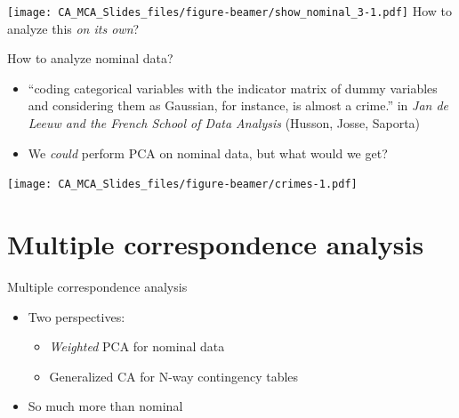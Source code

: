 \documentclass[
  ignorenonframetext,
]{beamer}
\providecommand{\tightlist}{%
  \setlength{\itemsep}{0pt}\setlength{\parskip}{0pt}}
\begin{document}
\begin{frame}

\texttt{[image: CA\_MCA\_Slides\_files/figure-beamer/show\_nominal\_3-1.pdf]}
How to analyze this \emph{on its own}?

\end{frame}

\begin{frame}{How to analyze nominal data?}
\protect\hypertarget{how-to-analyze-nominal-data}{}

\begin{itemize}[<+->]
\tightlist
\item
  ``coding categorical variables with the indicator matrix of dummy
  variables and considering them as Gaussian, for instance, is almost a
  crime.'' in \emph{Jan de Leeuw and the French School of Data Analysis}
  (Husson, Josse, Saporta)
\item
  We \emph{could} perform PCA on nominal data, but what would we get?
\end{itemize}

\end{frame}

\begin{frame}

\texttt{[image: CA\_MCA\_Slides\_files/figure-beamer/crimes-1.pdf]}

\end{frame}

\hypertarget{multiple-correspondence-analysis}{%
\section{Multiple correspondence
analysis}\label{multiple-correspondence-analysis}}

\begin{frame}{Multiple correspondence analysis}
\protect\hypertarget{multiple-correspondence-analysis-1}{}

\begin{itemize}[<+->]
\tightlist
\item
  Two perspectives:

  \begin{itemize}[<+->]
  \tightlist
  \item
    \emph{Weighted} PCA for nominal data
  \item
    Generalized CA for N-way contingency tables
  \end{itemize}
\item
  So much more than nominal
\end{itemize}

\end{frame}
\end{document}
